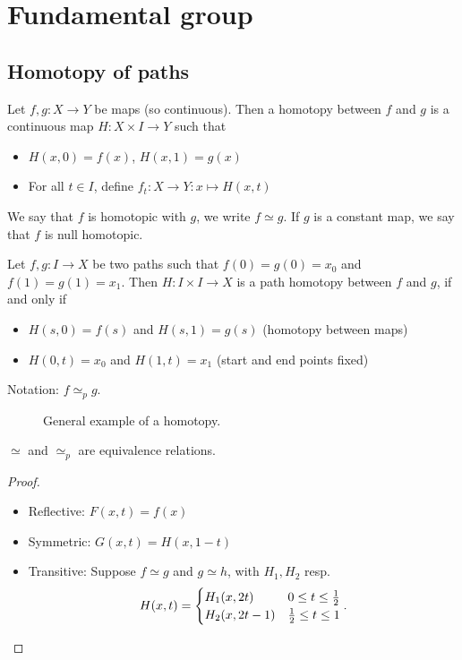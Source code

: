 \setcounter{chapter}{8}
\chapter{Fundamental group}

\setcounter{section}{50}
\section{Homotopy of paths}
\begin{definition}[Homotopy]
    Let $f,g:X\to Y$ be maps (so continuous). Then a homotopy between $f$ and $g$ is a continuous map $H: X\times I \to Y$ such that
    \begin{itemize}
        \item $H(x, 0) = f(x)$, $H(x, 1) = g(x)$ 
        \item For all $t \in I$, define $f_t: X \to  Y: x \mapsto  H(x, t)$
    \end{itemize}
    We say that $f$ is homotopic with $g$, we write $f \simeq g$.
    If $g$ is a constant map, we say that $f$ is null homotopic.
\end{definition}

\begin{definition}
    Let $f, g: I \to  X$ be two paths such that $f(0) = g(0) = x_0$ and $f(1) = g(1) = x_1$. Then $H: I \times  I \to  X$ is a path homotopy between $f$ and $g$, if and only if
    \begin{itemize}
        \item $H(s,0) = f(s)$ and  $H(s, 1) = g(s)$ (homotopy between maps)
        \item  $H(0, t) = x_0$ and $H(1, t) = x_1$ (start and end points fixed)
    \end{itemize}
    Notation: $f \simeq_p g$.
\end{definition}


\begin{figure}[ht]
    \centering
    \caption{General example of a homotopy.}
    \label{fig:homotopy-general-example}
\end{figure}


\begin{lemma}
    $\simeq$ and  $\simeq_p$ are equivalence relations.
\end{lemma}
\begin{proof}
    \leavevmode
    \begin{itemize}
        \item Reflective: $F(x, t) = f(x)$
        \item Symmetric: $G(x, t) = H(x, 1-t)$ 
        \item Transitive:  Suppose $f \simeq g$ and  $g \simeq h$, with  $H_1, H_2$ resp.
            \[
                H(x, t) = \begin{cases}
                    H_1(x, 2t) & 0 \le t \le  \frac{1}{2}\\
                    H_2(x, 2t-1) & \frac{1}{2} \le  t \le  1
                \end{cases}
            . \qedhere
        \] 
    \end{itemize}
\end{proof}


